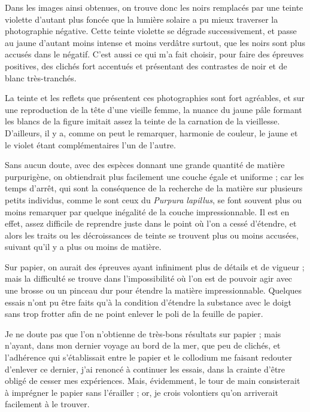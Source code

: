 \documentclass[a4paper, 11pt, oneside, polutonikogreek, french]{article}
\begin{document}
Dans les images ainsi obtenues, on trouve donc les noirs remplacés par une teinte violette d'autant plus foncée que la lumière solaire a pu mieux traverser la photographie négative. Cette teinte violette se dégrade successivement, et passe au jaune d'autant moins intense et moins verdâtre surtout, que les noirs sont plus accusés dans le négatif. C'est aussi ce qui m'a fait choisir, pour faire des épreuves positives, des clichés fort accentués et présentant des contrastes de noir et de blanc très-tranchés.

La teinte et les reflets que présentent ces photographies sont fort agréables, et sur une reproduction de la tête d'une vieille femme, la nuance du jaune pâle formant les blancs de la figure imitait assez la teinte de la carnation de la vieillesse. D'ailleurs, il y a, comme on peut le remarquer, harmonie de couleur, le jaune et le violet étant complémentaires l'un de l'autre.

Sans aucun doute, avec des espèces donnant une grande quantité de matière purpurigène, on obtiendrait plus facilement une couche égale et uniforme ; car les temps d'arrêt, qui sont la conséquence de la recherche de la matière sur plusieurs petits individus, comme le sont ceux du \emph{Purpura lapillus}, se font souvent plus ou moins remarquer par quelque inégalité de la couche impressionnable. Il est en effet, assez difficile de reprendre juste dans le point où l'on a cessé d'étendre, et alors les traits ou les décroissances de teinte se trouvent plus ou moins accusées, suivant qu'il y a plus ou moins de matière.

Sur papier, on aurait des épreuves ayant infiniment plus de détails et de vigueur ; mais la difficulté se trouve dans l'impossibilité où l'on est de pouvoir agir avec une brosse ou un pinceau dur pour étendre la matière impressionnable. Quelques essais n'ont pu être faits qu'à la condition d'étendre la substance avec le doigt sans trop frotter afin de ne point enlever le poli de la feuille de papier.

Je ne doute pas que l'on n'obtienne de très-bons résultats sur papier ; mais n'ayant, dans mon dernier voyage au bord de la mer, que peu de clichés, et l'adhérence qui s'établissait entre le papier et le collodium me faisant redouter d'enlever ce dernier, j'ai renoncé à continuer les essais, dans la crainte d'être obligé de cesser mes expériences. Mais, évidemment, le tour de main consisterait à imprégner le papier sans l'érailler ; or, je crois volontiers qu'on arriverait facilement à le trouver.
\end{document}
